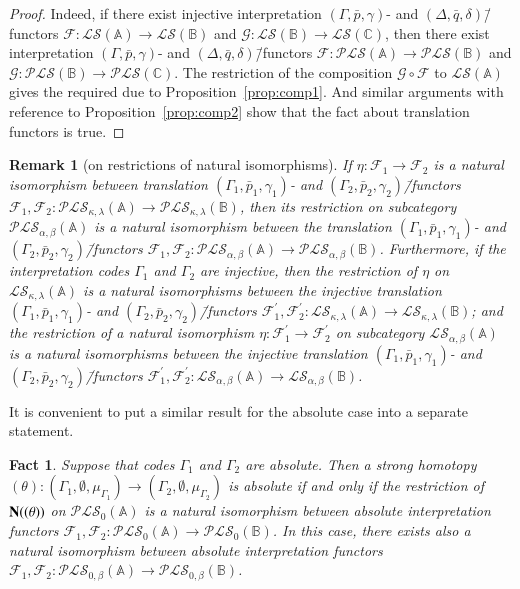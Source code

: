 \documentclass[12pt]{article}
\newtheorem{fact}{Fact}
\newtheorem{remark}{Remark}
\theoremstyle{definition}
\def\MA{{\mathbb{A}}}
\def\MB{{\mathbb{B}}}
\def\MC{{\mathbb{C}}}
\def\F{{\mathcal{F}}}
\def\G{{\mathcal{G}}}
\def\PLS{{\mathcal{PLS}}}
\def\LS{{\mathcal{LS}}}
\begin{document}
\begin{proof}
Indeed, if there exist injective interpretation $(\Gamma,\bar p,\gamma)$- and $(\Delta,\bar q,\delta)$\=/functors $\F\colon \LS(\MA)\to \LS(\MB)$ and $\G\colon \LS(\MB)\to \LS(\MC)$, then there exist interpretation $(\Gamma,\bar p,\gamma)$- and $(\Delta,\bar q,\delta)$\=/functors $\F\colon \PLS(\MA)\to \PLS(\MB)$ and $\G\colon \PLS(\MB)\to \PLS(\MC)$. The restriction of the composition $\G\circ\F$ to $\LS(\MA)$ gives the required due to Proposition~\ref{prop:comp1}. And similar arguments with reference to Proposition~\ref{prop:comp2} show that the fact about translation functors is true.
\end{proof}

\begin{remark}[on restrictions of natural isomorphisms]\label{remark:natur_iso}
If $\eta\colon \F_1\to\F_2$ is a natural isomorphism between translation $(\Gamma_1,\bar p_1,\gamma_1)$- and $(\Gamma_2,\bar p_2,\gamma_2)$\=/functors $\F_1,\F_2\colon\PLS_{\kappa,\lambda}(\MA)\to\PLS_{\kappa,\lambda}(\MB)$, then its restriction on subcategory $\PLS_{\alpha,\beta}(\MA)$ is a natural isomorphism between the translation $(\Gamma_1,\bar p_1,\gamma_1)$- and $(\Gamma_2,\bar p_2,\gamma_2)$\=/functors $\F_1,\F_2\colon\PLS_{\alpha,\beta}(\MA)\to\PLS_{\alpha,\beta}(\MB)$. Furthermore, if the interpretation codes $\Gamma_1$ and $\Gamma_2$ are injective, then the restriction of $\eta$ on $\LS_{\kappa,\lambda}(\MA)$ is a natural isomorphisms between the injective translation $(\Gamma_1,\bar p_1,\gamma_1)$- and $(\Gamma_2,\bar p_2,\gamma_2)$\=/functors $\F^\prime_1,\F^\prime_2\colon\LS_{\kappa,\lambda}(\MA)\to\LS_{\kappa,\lambda}(\MB)$; and the restriction of a natural isomorphism $\eta\colon \F^\prime_1\to \F^\prime_2$ on subcategory $\LS_{\alpha,\beta}(\MA)$ is a natural isomorphisms between the injective translation $(\Gamma_1,\bar p_1,\gamma_1)$- and $(\Gamma_2,\bar p_2,\gamma_2)$\=/functors $\F^\prime_1,\F^\prime_2\colon\LS_{\alpha,\beta}(\MA)\to\LS_{\alpha,\beta}(\MB)$.
\end{remark}

It is convenient to put a similar result for the absolute case into a separate statement.

\begin{fact}\label{cor:abs_hom}
Suppose that codes $\Gamma_1$ and $\Gamma_2$ are absolute. Then a strong homotopy $(\theta)\colon (\Gamma_1,\emptyset,\mu_{\Gamma_1})\to(\Gamma_2,\emptyset,\mu_{\Gamma_2})$ is absolute if and only if the restriction of ${\bf N}((\theta))$ on $\PLS_0(\MA)$ is a natural isomorphism between absolute interpretation functors $\F_1,\F_2\colon \PLS_0(\MA)\to \PLS_0(\MB)$. In this case, there exists also a natural isomorphism between absolute interpretation functors $\F_1,\F_2\colon \PLS_{0,\beta}(\MA)\to \PLS_{0,\beta}(\MB)$. 
\end{fact}
\end{document}
